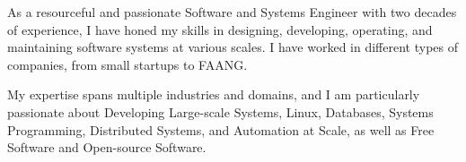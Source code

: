 
\begin{cvparagraph}
	As a resourceful and passionate Software and Systems Engineer with two decades of experience, I have honed my skills
	in designing, developing, operating, and maintaining software systems at various scales. I have worked in different
	types of companies, from small startups to FAANG.

	My expertise spans multiple industries and domains, and I am particularly passionate about Developing Large-scale
	Systems, Linux, Databases, Systems Programming, Distributed Systems, and Automation at Scale, as well as Free Software
	and Open-source Software.
\end{cvparagraph}
